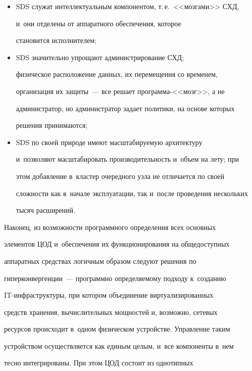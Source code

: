\begin{itemize}


\item SDS служат интеллектуальным компонентом, т.\,е.\ <<мозгами>> СХД, 


и~они отделены от аппаратного обеспечения, которое 


становится исполнителем;


\item SDS значительно упрощают администрирование СХД; 


физическое расположение данных, их перемещения со временем, 


организация их защиты~--- все решает программа-<<мозг>>, а не 


администратор, но администратор задает политики, на основе которых 


решения принимаются;


\item SDS по своей природе имеют масштабируемую архитектуру 


и~позволяют масштабировать производительность и~объем на лету; при 


этом добавление в~кластер очередного узла не отличается по своей 


сложности как в~начале эксплуатации, так и~после проведения нескольких 


тысяч расширений.


\end{itemize}





Наконец, из возможности программного определения всех основных 


элементов ЦОД и~обеспечения их функционирования на общедоступных 


аппаратных средствах логичным образом следуют решения по 


гиперконвергенции~--- программно определяемому подходу к~созданию  


IT-инф\-ра\-струк\-ту\-ры, при котором объединение виртуализированных 


средств хранения, вычислительных мощностей и, возможно, сетевых 


ресурсов происходит в~одном физическом устройстве. Управление таким 


устройством осуществляется как единым целым, и~все компоненты в~нем 


тесно интегрированы. При этом ЦОД состоит из однотипных 


